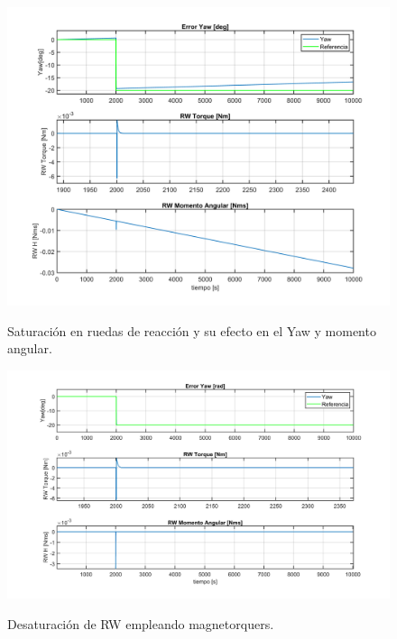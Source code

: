 \begin{figure}[!h]
	\begin{center}
		\includegraphics[scale=0.55]{imagenes/resultados/Desaturation.PNG}\\
	\end{center}
	\caption{Saturación en ruedas de reacción y su efecto en el Yaw y momento angular.}
	\label{fig:saturacion}	 	
\end{figure}

\begin{figure}[!ht]
	\begin{center}
		\includegraphics[scale=0.55]{imagenes/resultados/Desaturation2.PNG}\\
	\end{center}
	\caption{Desaturación de RW empleando magnetorquers.}
	\label{fig:desaturacion}	 	
\end{figure}

